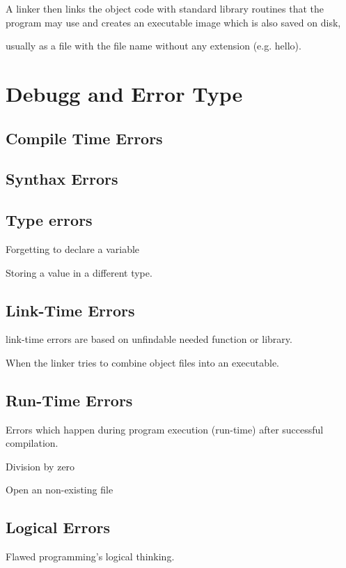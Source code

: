 \documentclass[openany]{report}
\begin{document}
A linker then links the object code with standard library routines that the program may use and creates an executable image which is also saved on disk,

usually as a file with the file name without any extension (e.g. hello).

\section{Debugg and Error Type}

\subsection{Compile Time Errors}

\subsection{Synthax Errors}

\subsection{Type errors}

Forgetting to declare a variable

Storing a value in a different type. 

\subsection{Link-Time Errors}

link-time errors are based on unfindable needed function or library.

When the linker tries to combine object files into an executable.

\subsection{Run-Time Errors}

Errors which happen during program execution (run-time) after successful compilation.

Division by zero

Open an non-existing file

\subsection{Logical Errors}

Flawed programming's logical thinking. 
\end{document}
